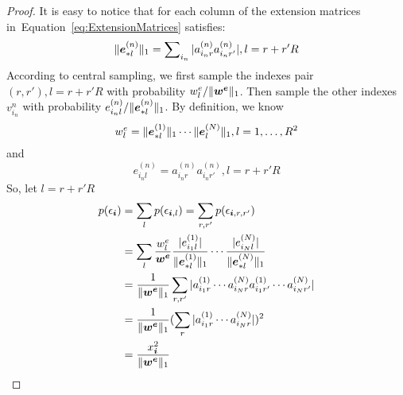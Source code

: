 \documentclass[letterpaper]{article}
\newcommand{\Sca}[3]{{#1}^{(#2)}_{i_#2#3}}%
\newcommand{\V}[1]{{\bm{{\MakeLowercase{#1}}}}}
\newcommand{\VnC}[3]{\V{#1}^{(#2)}_{#3}}
\newcommand{\norm}[2]{\|#1\|_{#2}}
\newcommand{\Eqn}[1]   {Equation~\ref{eq:#1}}
\begin{document}
\begin{proof}
It is easy to notice that
for each column of the extension matrices in~\Eqn{ExtensionMatrices} satisfies:
\[
    \norm{\VnC{e}{n}{*l}}{1} = \sum\nolimits_{i_n}|\Sca{a}{n}{r}\Sca{a}{n}{r'}|,l=r+r'R
\]
According to central sampling,
we first sample the indexes pair $(r,r'),l = r+r'R$
with probability $w^e_l/\norm{\V{w^e}}{1}$.
Then sample the other indexes $v^{n}_{i_n}$
with probability $e^{(n)}_{i_nl}/\norm{\VnC{e}{n}{*l}}{1}$.
By definition, we know
\[
w^e_l = \norm{\VnC{e}{1}{*l}}{1}\cdots \norm{\VnC{e}{N}{l}}{1}, l = 1,\ldots,R^2
\]
and
\[
e^{(n)}_{i_nl} = \Sca{a}{n}{r}\Sca{a}{n}{r'}, l = r+r'R
\]
So, let $l = r+r'R$
\begin{align*}
p(\epsilon_{\V{i}})
& = \sum_{l}    p(\epsilon_{\V{i},l})
  = \sum_{r,r'} p(\epsilon_{\V{i},r,r'})\\
& = \sum_{l} \frac{w^e_l}{\V{w^e}}
             \frac{|e^{(1)}_{i_1l}|}{\norm{\VnC{e}{1}{*l}}{1}}\cdots
             \frac{|e^{(N)}_{i_Nl}|}{\norm{\VnC{e}{N}{*l}}{1}} \\
& = \frac{1}{\norm{\V{W^e}}{1}}
    \sum_{r,r'} |\Sca{a}{1}{r} \cdots\Sca{a}{N}{r}\Sca{a}{1}{r'}\cdots\Sca{a}{N}{r'}| \\
& = \frac{1}{\norm{\V{W^e}}{1}}
    (\sum_{r}|\Sca{a}{1}{r}\cdots\Sca{a}{N}{r}|)^2\\
& = \frac{x_{\V{i}}^2}{\norm{\V{w^e}}{1}}
\end{align*}
\end{proof}
\end{document}
